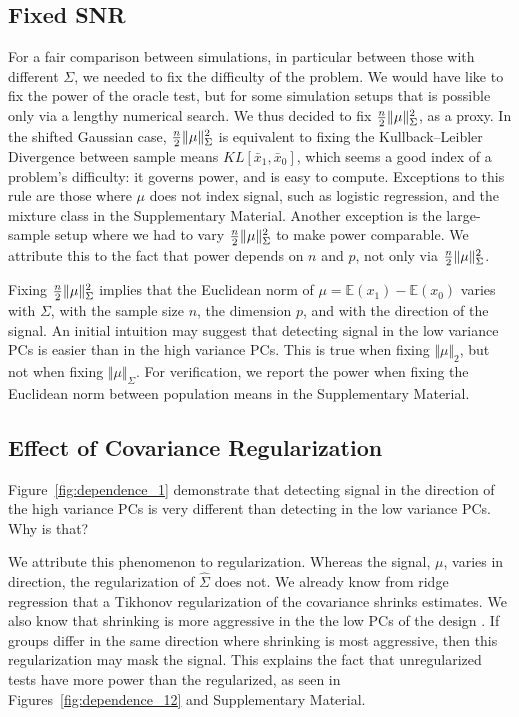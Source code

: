 \documentclass[]{bio}
\begin{document}
\subsection{Fixed SNR}
\label{sec:fix_snr}

For a fair comparison between simulations, in particular between those with different $\Sigma$, we needed to fix the difficulty of the problem.
We would have like to fix the power of the oracle test, but for some simulation setups that is possible only via a lengthy numerical search. 
We thus decided to fix $\frac{n}{2}\Vert \mu \Vert^2_\Sigma$, as a proxy.
In the shifted Gaussian case, $\frac{n}{2}\Vert \mu \Vert^2_\Sigma$ is equivalent to fixing the Kullback–Leibler Divergence between sample means $KL[\bar x_1,\bar x_0]$, which seems a good index of a problem's difficulty: it governs power, and is easy to compute. 
Exceptions to this rule are those where $\mu$ does not index signal, such as logistic regression, and the mixture class in the Supplementary Material. 
Another exception is the large-sample setup where we had to vary $\frac{n}{2}\Vert \mu \Vert^2_\Sigma$ to make power comparable. 
We attribute this to the fact that power depends on $n$ and $p$, not only via $\frac{n}{2}\Vert \mu \Vert^2_\Sigma$.

Fixing $\frac{n}{2}\Vert \mu \Vert^2_\Sigma$ implies that the Euclidean norm of $\mu=\mathbb{E}(x_1)-\mathbb{E}(x_0)$ varies with $\Sigma$, with the sample size $n$, the dimension $p$, and with the direction of the signal.
An initial intuition may suggest that detecting signal in the low variance PCs is easier than in the high variance PCs. 
This is true when fixing $\Vert \mu \Vert_2$, but not when fixing $\Vert \mu \Vert_{\Sigma}$.
For verification, we report the power when fixing the Euclidean norm between population means in the Supplementary Material.



\subsection{Effect of Covariance Regularization}
\label{sec:regularizaton}

Figure~\ref{fig:dependence_1} demonstrate that detecting signal in the direction of the high variance PCs is very different than detecting in the low variance PCs.
Why is that?

We attribute this phenomenon to regularization.
Whereas the signal, $\mu$, varies in direction, the regularization of $\hat \Sigma$ does not. 
We already know from ridge regression that a Tikhonov regularization of the covariance shrinks estimates. 
We also know that shrinking is more aggressive in the the low PCs of the design \citep{hastie_elements_2003}. 
If groups differ in the same direction where shrinking is most aggressive, then this regularization may mask the signal. 
This explains the fact that unregularized tests have more power than the regularized, as seen in Figures~\ref{fig:dependence_12} and Supplementary Material.
\end{document}
